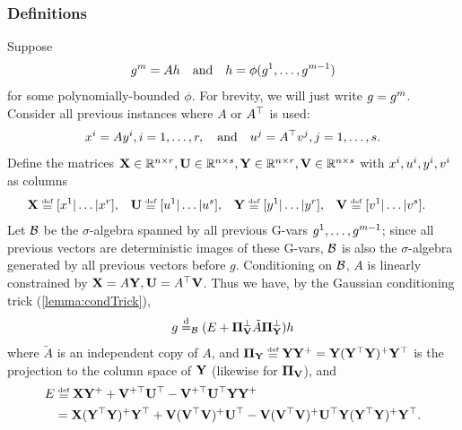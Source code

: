 \documentclass[main.tex]{subfiles}
\begin{document}
\subsubsection{Definitions}
Suppose
\begin{align}
    g^{\MM} = A h \quad \text{and} \quad h = \phi(g^{1}, \ldots, g^{\MM - 1})
    \label{eqn:gAh}
\end{align}
for some polynomially-bounded $\phi$.
For brevity, we will just write $g = g^{m}$.
Consider all previous instances where $A$ or $A^\top$ is used: 
\begin{equation}
  \xme^{i} = A \yme^{i}, i = 1, \ldots, r, \quad\text{and}\quad
  \ume^{j} = A^\trsp \vme^{j}, j = 1, \ldots, s.
  \label{eqn:xAy&uATv}
\end{equation}
Define the matrices $\mathbf{X} \in \mathbb{R}^{n\times r}, \mathbf{U} \in \mathbb{R}^{n \times s}, \mathbf{Y} \in \mathbb{R}^{n \times r}, \mathbf{V} \in \mathbb{R}^{n \times s}$ with $x^i, u^i, y^i, v^i$ as columns
\begin{align}
\Xme &\defeq [\xme^1| \ldots| \xme^{r}],&
\Ume &\defeq [\ume^1| \ldots| \ume^{s}],&
\Yme &\defeq [\yme^1| \ldots| \yme^r],&
\Vme &\defeq [\vme^1| \ldots| \vme^s]
.
\label{eqn:XUYZ}
\end{align}
Let $\mathcal{B}$ be the $\sigma$-algebra spanned by all previous G-vars $g^1, \ldots, g^{m-1}$; since all previous vectors are deterministic images of these G-vars, $\mathcal{B}$ is also the $\sigma$-algebra generated by all previous vectors before $g$.
Conditioning on $\mathcal{B}$, $A$ is linearly constrained by $\mathbf{X} = A\mathbf{Y}, \mathbf{U} = A^\top \mathbf{V}$.
Thus we have, by the Gaussian conditioning trick (\cref{lemma:condTrick}),
\begin{align}
    g \disteq_{\Bb} (E + \PP_{\Vme}^\perp \tilde A \PP_{\Yme}^\perp) h
    \label{eqn:gCondTrick}
\end{align}
where
$\tilde A$ is an independent copy of $A$, and $\PP_{\Yme} \defeq \Yme \Yme^+ = \Yme(\Yme^\trsp \Yme)^+ \Yme^\trsp$ is the projection to the column space of $\mathbf{Y}$ (likewise for $\boldsymbol{\Pi}_{\mathbf{V}}$), and
\begin{equation}
  \begin{aligned}
  E
      &\defeq
          \Xme \Yme^+
          + \Vme^{+\trsp} \Ume^{\trsp}
          - \Vme^{+\trsp} \Ume^\trsp \Yme \Yme^+
          \\
      &=
          \Xme (\Yme^\trsp \Yme)^+ \Yme^{\trsp}
          + \Vme (\Vme^{\trsp} \Vme)^+ \Ume^{\trsp}
          - \Vme (\Vme^{\trsp} \Vme)^+ \Ume^\trsp \Yme (\Yme^\trsp \Yme)^+ \Yme^\trsp.
  \end{aligned}
  \label{eqn:Eexpansion}
\end{equation}
\end{document}
